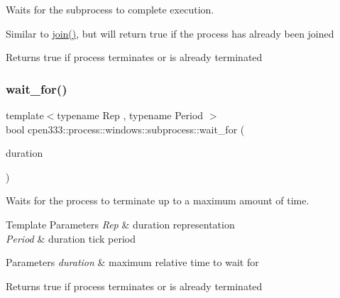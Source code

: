Waits for the subprocess to complete execution. 

Similar to \hyperlink{classcpen333_1_1process_1_1windows_1_1subprocess_a973a466ad1f7299d1511e4a0628bc3f4}{join()}, but will return true if the process has already been joined

\begin{DoxyReturn}{Returns}
true if process terminates or is already terminated 
\end{DoxyReturn}
\mbox{\label{classcpen333_1_1process_1_1windows_1_1subprocess_aed7bf88b47dfa88ba8c97d6dbc94c124}} 
\subsubsection{\texorpdfstring{wait\+\_\+for()}{wait\_for()}}
{\footnotesize\ttfamily template$<$typename Rep , typename Period $>$ \\
bool cpen333\+::process\+::windows\+::subprocess\+::wait\+\_\+for (\begin{DoxyParamCaption}\item[{const std\+::chrono\+::duration$<$ Rep, Period $>$ \&}]{duration }\end{DoxyParamCaption})\hspace{0.3cm}{\ttfamily [inline]}}



Waits for the process to terminate up to a maximum amount of time. 


\begin{DoxyTemplParams}{Template Parameters}
{\em Rep} & duration representation \\
\hline
{\em Period} & duration tick period \\
\hline
\end{DoxyTemplParams}

\begin{DoxyParams}{Parameters}
{\em duration} & maximum relative time to wait for \\
\hline
\end{DoxyParams}
\begin{DoxyReturn}{Returns}
true if process terminates or is already terminated 
\end{DoxyReturn}
\mbox{\label{classcpen333_1_1process_1_1windows_1_1subprocess_a228f617ee1ef52374041d6dd094105ba}} 
